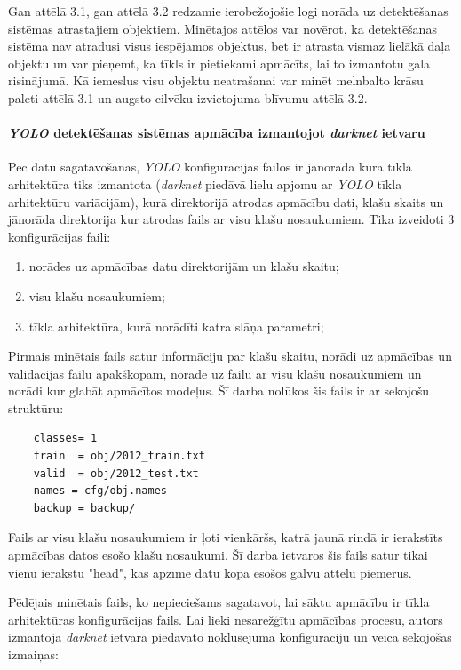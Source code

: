 Gan attēlā 3.1, gan attēlā 3.2 redzamie ierobežojošie logi norāda uz detektēšanas sistēmas atrastajiem objektiem. Minētajos attēlos var novērot, ka detektēšanas sistēma nav atradusi visus iespējamos objektus, bet ir atrasta vismaz lielākā daļa objektu un var pieņemt, ka tīkls ir pietiekami apmācīts, lai to izmantotu gala risinājumā. Kā iemeslus visu objektu neatrašanai var minēt melnbalto krāsu paleti attēlā 3.1 un augsto cilvēku izvietojuma blīvumu attēlā 3.2. 

\paragraph{\textit{YOLO} detektēšanas sistēmas apmācība izmantojot \textit{darknet} ietvaru}
\hfill\par
Pēc datu sagatavošanas, \textit{YOLO} konfigurācijas failos ir jānorāda kura tīkla arhitektūra tiks izmantota (\textit{darknet} piedāvā lielu apjomu ar \textit{YOLO} tīkla arhitektūru variācijām), kurā direktorijā atrodas apmācību dati, klašu skaits un jānorāda direktorija kur atrodas fails ar visu klašu nosaukumiem. Tika izveidoti 3 konfigurācijas faili: 
\begin{enumerate}
	\item norādes uz apmācības datu direktorijām un klašu skaitu; 
	\item visu klašu nosaukumiem;
	\item tīkla arhitektūra, kurā norādīti katra slāņa parametri;
\end{enumerate}

Pirmais minētais fails satur informāciju par klašu skaitu, norādi uz apmācības un validācijas failu apakškopām, norāde uz failu ar visu klašu nosaukumiem un norādi kur glabāt apmācītos modeļus. Šī darba nolūkos šis fails ir ar sekojošu struktūru: 
\begin{lstlisting}
	classes= 1  
	train  = obj/2012_train.txt  
	valid  = obj/2012_test.txt  
	names = cfg/obj.names  
	backup = backup/
\end{lstlisting}

Fails ar visu klašu nosaukumiem ir ļoti vienkāršs, katrā jaunā rindā ir ierakstīts apmācības datos esošo klašu nosaukumi. Šī darba ietvaros šis fails satur tikai vienu ierakstu "head", kas apzīmē datu kopā esošos galvu attēlu piemērus.

Pēdējais minētais fails, ko nepieciešams sagatavot, lai sāktu apmācību ir tīkla arhitektūras konfigurācijas fails. Lai lieki nesarežģītu apmācības procesu, autors izmantoja \textit{darknet} ietvarā piedāvāto noklusējuma konfigurāciju un veica sekojošas izmaiņas:

